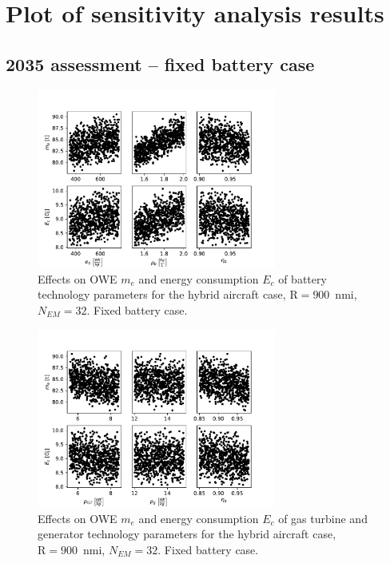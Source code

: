 \chapter{Plot of sensitivity analysis results}
\label{app:sens_plot}

\section{2035 assessment -- fixed battery case}
\label{sec:app_sens_an_plot_techno_batt_fix}

\begin{figure}[h!]
	\centering
	\includegraphics[keepaspectratio, width=0.7\textwidth]{images/app_sens_plot/techno_sensitivity_battery}
	\caption{Effects on OWE $m_e$ and energy consumption $E_c$ of battery technology parameters for the hybrid aircraft case, $\textrm{R}=900$~nmi, $N_{EM}=32$. Fixed battery case.}
	\label{fig:sens_an_battery}
\end{figure}
\begin{figure}[h!]
	\centering
	\includegraphics[keepaspectratio, width=0.7\textwidth]{images/app_sens_plot/techno_sensitivity_gen}
	\caption{Effects on OWE $m_e$ and energy consumption $E_c$ of gas turbine and generator technology parameters for the hybrid aircraft case, $\textrm{R}=900$~nmi, $N_{EM}=32$. Fixed battery case.}
	\label{fig:sens_an_gen}
\end{figure}
